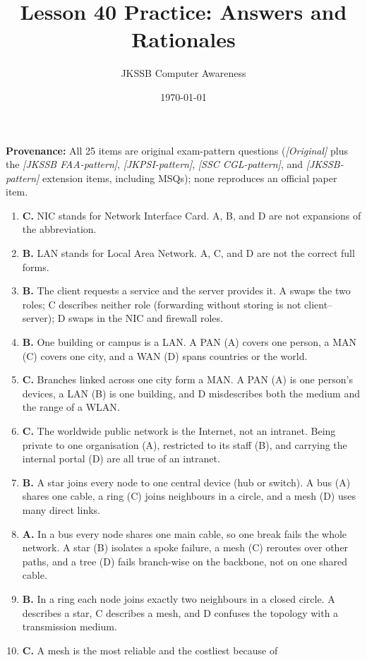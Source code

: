 \documentclass[11pt]{article}
\title{Lesson 40 Practice: Answers and Rationales}
\author{JKSSB Computer Awareness}
\date{\today}
\begin{document}
\maketitle
\noindent\textbf{Provenance:} All 25 items are original exam-pattern questions (\textit{[Original]} plus the \textit{[JKSSB FAA-pattern]}, \textit{[JKPSI-pattern]}, \textit{[SSC CGL-pattern]}, and \textit{[JKSSB-pattern]} extension items, including MSQs); none reproduces an official paper item.
\begin{enumerate}[label=\textbf{Q\arabic*.}, leftmargin=*]
\item \textbf{C.} NIC stands for Network Interface Card. A, B, and D are not
  expansions of the abbreviation.
\item \textbf{B.} LAN stands for Local Area Network. A, C, and D are not the
  correct full forms.
\item \textbf{B.} The client requests a service and the server provides it.
  A swaps the two roles; C describes neither role (forwarding without
  storing is not client--server); D swaps in the NIC and firewall roles.
\item \textbf{B.} One building or campus is a LAN. A PAN (A) covers one
  person, a MAN (C) covers one city, and a WAN (D) spans countries or the
  world.
\item \textbf{C.} Branches linked across one city form a MAN. A PAN (A) is
  one person's devices, a LAN (B) is one building, and D misdescribes both
  the medium and the range of a WLAN.
\item \textbf{C.} The worldwide public network is the Internet, not an
  intranet. Being private to one organisation (A), restricted to its staff
  (B), and carrying the internal portal (D) are all true of an intranet.
\item \textbf{B.} A star joins every node to one central device (hub or
  switch). A bus (A) shares one cable, a ring (C) joins neighbours in a
  circle, and a mesh (D) uses many direct links.
\item \textbf{A.} In a bus every node shares one main cable, so one break
  fails the whole network. A star (B) isolates a spoke failure, a mesh (C)
  reroutes over other paths, and a tree (D) fails branch-wise on the
  backbone, not on one shared cable.
\item \textbf{B.} In a ring each node joins exactly two neighbours in a
  closed circle. A describes a star, C describes a mesh, and D confuses the
  topology with a transmission medium.
\item \textbf{C.} A mesh is the most reliable and the costliest because of

\end{enumerate}
\end{document}
